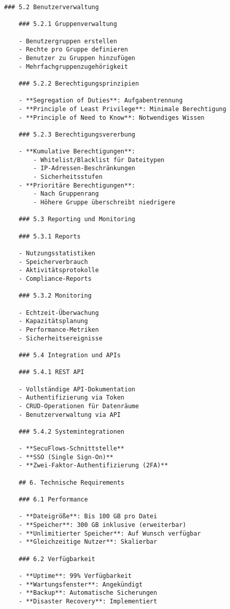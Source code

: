 \begin{Verbatim}[breaklines=true]
    ### 5.2 Benutzerverwaltung
    
    ### 5.2.1 Gruppenverwaltung
    
    - Benutzergruppen erstellen
    - Rechte pro Gruppe definieren
    - Benutzer zu Gruppen hinzufügen
    - Mehrfachgruppenzugehörigkeit
    
    ### 5.2.2 Berechtigungsprinzipien
    
    - **Segregation of Duties**: Aufgabentrennung
    - **Principle of Least Privilege**: Minimale Berechtigung
    - **Principle of Need to Know**: Notwendiges Wissen
    
    ### 5.2.3 Berechtigungsvererbung
    
    - **Kumulative Berechtigungen**:
        - Whitelist/Blacklist für Dateitypen
        - IP-Adressen-Beschränkungen
        - Sicherheitsstufen
    - **Prioritäre Berechtigungen**:
        - Nach Gruppenrang
        - Höhere Gruppe überschreibt niedrigere
    
    ### 5.3 Reporting und Monitoring
    
    ### 5.3.1 Reports
    
    - Nutzungsstatistiken
    - Speicherverbrauch
    - Aktivitätsprotokolle
    - Compliance-Reports
    
    ### 5.3.2 Monitoring
    
    - Echtzeit-Überwachung
    - Kapazitätsplanung
    - Performance-Metriken
    - Sicherheitsereignisse
    
    ### 5.4 Integration und APIs
    
    ### 5.4.1 REST API
    
    - Vollständige API-Dokumentation
    - Authentifizierung via Token
    - CRUD-Operationen für Datenräume
    - Benutzerverwaltung via API
    
    ### 5.4.2 Systemintegrationen

    - **SecuFlows-Schnittstelle**
    - **SSO (Single Sign-On)**
    - **Zwei-Faktor-Authentifizierung (2FA)**
    
    ## 6. Technische Requirements
    
    ### 6.1 Performance
    
    - **Dateigröße**: Bis 100 GB pro Datei
    - **Speicher**: 300 GB inklusive (erweiterbar)
    - **Unlimitierter Speicher**: Auf Wunsch verfügbar
    - **Gleichzeitige Nutzer**: Skalierbar
    
    ### 6.2 Verfügbarkeit
    
    - **Uptime**: 99% Verfügbarkeit
    - **Wartungsfenster**: Angekündigt
    - **Backup**: Automatische Sicherungen
    - **Disaster Recovery**: Implementiert
    

\end{Verbatim}
